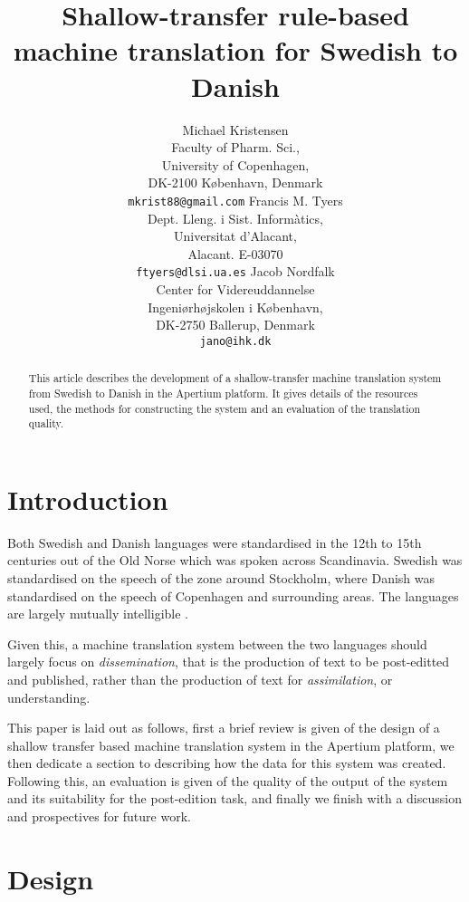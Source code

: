 \documentclass[11pt]{article}
\title{Shallow-transfer rule-based machine translation for Swedish to Danish}
\author{Michael Kristensen\\
  Faculty of Pharm. Sci., \\
  University of Copenhagen,\\
  DK-2100 København, Denmark \\
  {\tt mkrist88@gmail.com} \And
  Francis M. Tyers\\
  Dept. Lleng. i Sist. Informàtics, \\
  Universitat d'Alacant,\\
  Alacant. E-03070\\  
  {\tt ftyers@dlsi.ua.es} \And
  Jacob Nordfalk\\
  Center for Videreuddannelse\\
  Ingeniørhøjskolen i København,\\
  DK-2750 Ballerup, Denmark\\
  {\tt jano@ihk.dk}}
\date{}
\begin{document}
\maketitle

\begin{abstract}
  This article describes the development of a shallow-transfer machine translation
  system from Swedish to Danish in the Apertium platform. It gives details of the 
  resources used, the methods for constructing the system and an evaluation of the 
  translation quality.
\end{abstract}

\section{Introduction}

Both Swedish and Danish languages were standardised in the 12th to 15th centuries out
of the Old Norse which was spoken across Scandinavia. Swedish was standardised on the 
speech of the zone around Stockholm, where Danish was standardised on the speech of 
Copenhagen and surrounding areas. The languages are largely mutually intelligible \citep{Haugen1990}.

Given this, a machine translation system between the two languages should largely
focus on \emph{dissemination}, that is the production of text to be post-editted and 
published, rather than the production of text for \emph{assimilation}, or understanding.

This paper is laid out as follows, first a brief review is given of the design of a 
shallow transfer based machine translation system in the Apertium platform, we then 
dedicate a section to describing how the data for this system was created. Following this, 
an evaluation is given of the quality of the output of the system and its suitability 
for the post-edition task, and finally we finish with a discussion and prospectives 
for future work.


\section{Design}

\end{document}
